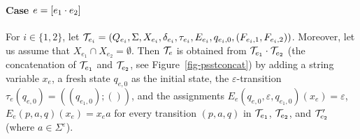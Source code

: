 %	

\paragraph{Case $e = [e_1 \cdot e_2]$} 
For $i \in \{1,2\}$, let  
$\mathcal{T}_{e_i} = (Q_{e_i}, \Sigma, X_{e_i}, \delta_{e_i}, \tau_{e_i}, E_{e_i}, q_{e_i,0}, (F_{e_i,1}, F_{e_i,2}))$. Moreover, let us assume that $X_{e_1}\cap X_{e_2}=\emptyset$.
Then $\mathcal{T}_e$ is obtained from $\mathcal{T}_{e_1} \cdot \mathcal{T}_{e_2}$ (the concatenation of $\mathcal{T}_{e_1}$ and $\mathcal{T}_{e_2}$, see Figure~\ref{fig-psstconcat}) by adding a string variable $x_e$, a fresh state $q_{e,0}$ as the initial state, the $\varepsilon$-transition $\tau_e(q_{e,0}) = ((q_{e_1,0});())$, and the assignments $E_e(q_{e,0}, \varepsilon, q_{e_1,0})(x_e) = \varepsilon$, $E_e(p, a, q)(x_e) = x_e a$ for every transition $(p, a, q)$ in $\mathcal{T}_{e_1}$, $\mathcal{T}_{e_2}$, and $\mathcal{T}'_{e_2}$ (where $a \in \Sigma^\varepsilon$).


